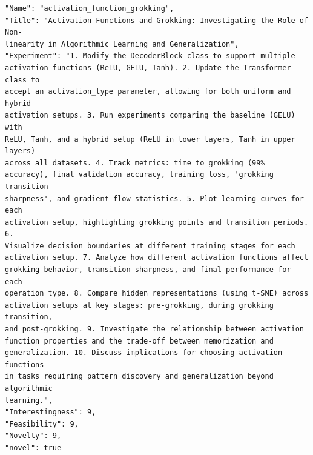 \begin{tcolorbox}[breakable,colback=blue!5!white, colframe=blue!75!black, title=Idea 42/50 - \texttt{activation\_function\_grokking}]
\small
\begin{verbatim}
"Name": "activation_function_grokking",
"Title": "Activation Functions and Grokking: Investigating the Role of Non-
linearity in Algorithmic Learning and Generalization",
"Experiment": "1. Modify the DecoderBlock class to support multiple
activation functions (ReLU, GELU, Tanh). 2. Update the Transformer class to
accept an activation_type parameter, allowing for both uniform and hybrid
activation setups. 3. Run experiments comparing the baseline (GELU) with
ReLU, Tanh, and a hybrid setup (ReLU in lower layers, Tanh in upper layers)
across all datasets. 4. Track metrics: time to grokking (99%
accuracy), final validation accuracy, training loss, 'grokking transition
sharpness', and gradient flow statistics. 5. Plot learning curves for each
activation setup, highlighting grokking points and transition periods. 6.
Visualize decision boundaries at different training stages for each
activation setup. 7. Analyze how different activation functions affect
grokking behavior, transition sharpness, and final performance for each
operation type. 8. Compare hidden representations (using t-SNE) across
activation setups at key stages: pre-grokking, during grokking transition,
and post-grokking. 9. Investigate the relationship between activation
function properties and the trade-off between memorization and
generalization. 10. Discuss implications for choosing activation functions
in tasks requiring pattern discovery and generalization beyond algorithmic
learning.",
"Interestingness": 9,
"Feasibility": 9,
"Novelty": 9,
"novel": true
\end{verbatim}
\end{tcolorbox}

